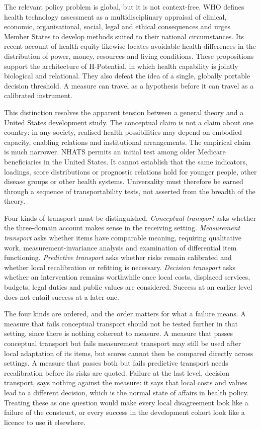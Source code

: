 The relevant policy problem is global, but it is not context-free. WHO defines
health technology assessment as a multidisciplinary appraisal of clinical,
economic, organisational, social, legal and ethical consequences and urges
Member States to develop methods suited to their national circumstances.
\citep{who_hta_2014,who_hta_institutional_2021} Its recent account of health
equity likewise locates avoidable health differences in the distribution of
power, money, resources and living conditions. \citep{who_sdh_equity_2025}
These propositions support the architecture of H-Potential, in which health
capability is jointly biological and relational. They also defeat the idea of a
single, globally portable decision threshold. A measure can travel as a
hypothesis before it can travel as a calibrated instrument.

This distinction resolves the apparent tension between a general theory and a
United States development study. The conceptual claim is not a claim about one
country: in any society, realised health possibilities may depend on embodied
capacity, enabling relations and institutional arrangements. The empirical
claim is much narrower. NHATS permits an initial test among older Medicare
beneficiaries in the United States. It cannot establish that the same
indicators, loadings, score distributions or prognostic relations hold for
younger people, other disease groups or other health systems. Universality must
therefore be earned through a sequence of transportability tests, not asserted
from the breadth of the theory. \citep{moons_2019,collins_2024}

Four kinds of transport must be distinguished. \emph{Conceptual transport}
asks whether the three-domain account makes sense in the receiving setting.
\emph{Measurement transport} asks whether items have comparable meaning,
requiring qualitative work, measurement-invariance analysis and examination of
differential item functioning. \emph{Predictive transport} asks whether risks
remain calibrated and whether local recalibration or refitting is necessary.
\emph{Decision transport} asks whether an intervention remains worthwhile once
local costs, displaced services, budgets, legal duties and public values are
considered. Success at an earlier level does not entail success at a later one.

The four kinds are ordered, and the order matters for what a failure means. A
measure that fails conceptual transport should not be tested further in that
setting, since there is nothing coherent to measure. A measure that passes
conceptual transport but fails measurement transport may still be used after
local adaptation of its items, but scores cannot then be compared directly
across settings. A measure that passes both but fails predictive transport
needs recalibration before its risks are quoted. Failure at the last level,
decision transport, says nothing against the measure: it says that local
costs and values lead to a different decision, which is the normal state of
affairs in health policy. Treating these as one question would make every
local disagreement look like a failure of the construct, or every success in
the development cohort look like a licence to use it elsewhere.


